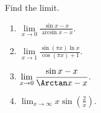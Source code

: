 Find the limit.
\begin{multicols}{2}
\begin{enumerate}[ref={\fcProblemRef}]
\item $\displaystyle \lim\limits_{x\to 0} \frac{\sin x-x }{\arcsin x-x } $.

\item \label{problemLHospital (sin (pi x) ln x )/ (cos pi x +1)}  $\displaystyle \lim\limits_{x\to 1} \frac{\sin \left(\pi x \right)\ln x }{\cos(\pi x)+1 } $.

\item \label{problemlim x to 0 (sin x - x)/(arctan x - x)} $\displaystyle \lim\limits_{x\to 0}\frac{\sin x- x}{\Arctan x -x}$.

\item \label{problemlimxtoinftysin(2/x)}
$ {\displaystyle \lim_{x \to \infty} x \sin\left(\frac{2}{x}\right)}.$

\end{enumerate}
\end{multicols}